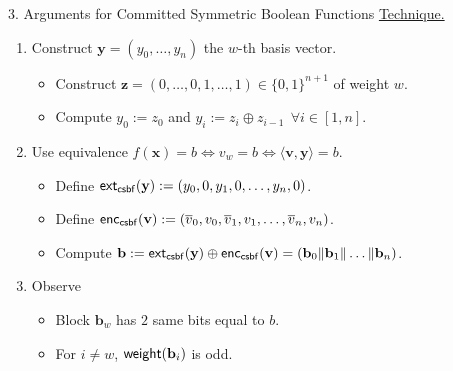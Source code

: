 \begin{frame}{3. Arguments for Committed Symmetric Boolean Functions}
	\underline{Technique.}\pause
	\begin{enumerate}
		\item Construct $\mathbf{y} = (y_0, \dots, y_n)$ the $w$-th basis vector.\pause
		\begin{itemize}
			\item Construct $\mathbf{z} = (0, \dots, 0, 1, \dots, 1) \in \{0,1\}^{n + 1}$ of weight $w$.\pause
			\item Compute $y_0 := z_0$ and $y_i := z_i \oplus z_{i - 1}~~ \forall i \in [1, n]$. \pause
		\end{itemize}
		\item Use equivalence $f(\mathbf{x}) = b \iff v_w = b \iff \langle\mathbf{v}, \mathbf{y}\rangle=b$.\pause
		\begin{itemize}
			\item Define $\mathsf{ext}_{\mathsf{csbf}}(\mathbf{y}) := (y_0, 0, y_1, 0, \dots, y_n, 0)$.\pause
			\item Define $\mathsf{enc}_{\mathsf{csbf}}(\mathbf{v}) := (\overline{v}_0, v_0, \overline{v}_1, v_1, \dots, \overline{v}_n, v_n)$.\pause
			\item Compute $\mathbf{b} := \mathsf{ext}_{\mathsf{csbf}}(\mathbf{y}) \oplus \mathsf{enc}_{\mathsf{csbf}}(\mathbf{v}) = (\mathbf{b}_0 \Vert \mathbf{b}_1\Vert \dots\Vert \mathbf{b}_n)$.\pause
		\end{itemize}
		\item Observe\pause
		\begin{itemize}
			\item Block $\mathbf{b}_w$ has $2$ same bits equal to $b$.\pause
			\item For $i \neq w$, $\mathsf{weight}(\mathbf{b}_i)$ is odd.
		\end{itemize}
	\end{enumerate}
\end{frame}